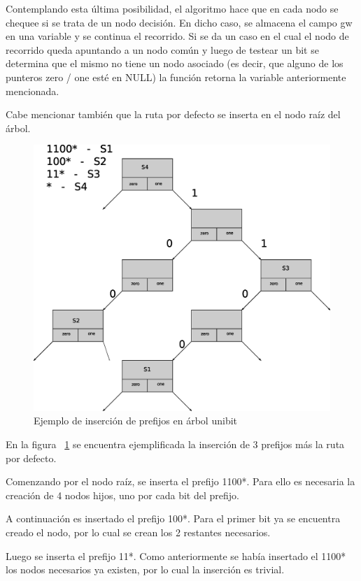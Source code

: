 Contemplando esta última posibilidad, el algoritmo hace que en cada nodo se chequee si se trata de un nodo decisión. En dicho caso, se almacena el campo gw en una variable y se continua el recorrido. Si se da un caso en el cual el nodo de recorrido queda apuntando a un nodo común y luego de testear un bit se determina que el mismo no tiene un nodo asociado (es decir, que alguno de los punteros zero / one esté en NULL) la función retorna la variable anteriormente mencionada. 

Cabe mencionar también que la ruta por defecto se inserta en el nodo raíz del árbol.

\begin{figure}[H]
  \centering
	\includegraphics[scale=0.50]{4-implementacion/graf/lluinsert09.eps}
  \caption{Ejemplo de inserción de prefijos en árbol unibit}
  \label{fig:lluinsert}
\end{figure}

En la figura ~\ref{fig:lluinsert} se encuentra ejemplificada la inserción de 3 prefijos más la ruta por defecto. 

Comenzando por el nodo raíz, se inserta el prefijo 1100*. Para ello es necesaria la creación de 4 nodos hijos, uno por cada bit del prefijo. 

A continuación es insertado el prefijo 100*. Para el primer bit ya se encuentra creado el nodo, por lo cual se crean los 2 restantes necesarios.

Luego se inserta el prefijo 11*. Como anteriormente se había insertado el 1100* los nodos necesarios ya existen, por lo cual la inserción es trivial.

